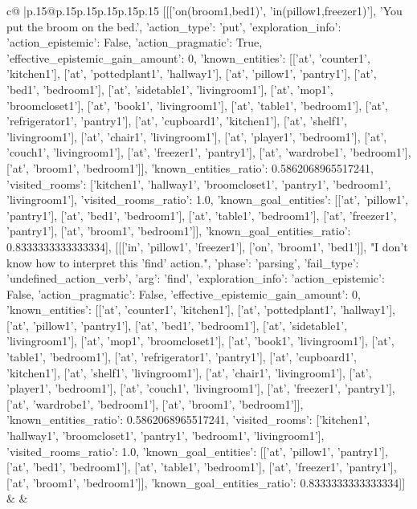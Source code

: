 \documentclass{article}
\begin{document}
{\begin{supertabular}{c@{$\;$}|p{.15\linewidth}@{}p{.15\linewidth}p{.15\linewidth}p{.15\linewidth}p{.15\linewidth}p{.15\linewidth}}
{{{	 [[['on(broom1,bed1)', 'in(pillow1,freezer1)'], 'You put the broom on the bed.', {'action_type': 'put', 'exploration_info': {'action_epistemic': False, 'action_pragmatic': True, 'effective_epistemic_gain_amount': 0, 'known_entities': [['at', 'counter1', 'kitchen1'], ['at', 'pottedplant1', 'hallway1'], ['at', 'pillow1', 'pantry1'], ['at', 'bed1', 'bedroom1'], ['at', 'sidetable1', 'livingroom1'], ['at', 'mop1', 'broomcloset1'], ['at', 'book1', 'livingroom1'], ['at', 'table1', 'bedroom1'], ['at', 'refrigerator1', 'pantry1'], ['at', 'cupboard1', 'kitchen1'], ['at', 'shelf1', 'livingroom1'], ['at', 'chair1', 'livingroom1'], ['at', 'player1', 'bedroom1'], ['at', 'couch1', 'livingroom1'], ['at', 'freezer1', 'pantry1'], ['at', 'wardrobe1', 'bedroom1'], ['at', 'broom1', 'bedroom1']], 'known_entities_ratio': 0.5862068965517241, 'visited_rooms': ['kitchen1', 'hallway1', 'broomcloset1', 'pantry1', 'bedroom1', 'livingroom1'], 'visited_rooms_ratio': 1.0, 'known_goal_entities': [['at', 'pillow1', 'pantry1'], ['at', 'bed1', 'bedroom1'], ['at', 'table1', 'bedroom1'], ['at', 'freezer1', 'pantry1'], ['at', 'broom1', 'bedroom1']], 'known_goal_entities_ratio': 0.8333333333333334}}], [[['in', 'pillow1', 'freezer1'], ['on', 'broom1', 'bed1']], "I don't know how to interpret this 'find' action.", {'phase': 'parsing', 'fail_type': 'undefined_action_verb', 'arg': 'find', 'exploration_info': {'action_epistemic': False, 'action_pragmatic': False, 'effective_epistemic_gain_amount': 0, 'known_entities': [['at', 'counter1', 'kitchen1'], ['at', 'pottedplant1', 'hallway1'], ['at', 'pillow1', 'pantry1'], ['at', 'bed1', 'bedroom1'], ['at', 'sidetable1', 'livingroom1'], ['at', 'mop1', 'broomcloset1'], ['at', 'book1', 'livingroom1'], ['at', 'table1', 'bedroom1'], ['at', 'refrigerator1', 'pantry1'], ['at', 'cupboard1', 'kitchen1'], ['at', 'shelf1', 'livingroom1'], ['at', 'chair1', 'livingroom1'], ['at', 'player1', 'bedroom1'], ['at', 'couch1', 'livingroom1'], ['at', 'freezer1', 'pantry1'], ['at', 'wardrobe1', 'bedroom1'], ['at', 'broom1', 'bedroom1']], 'known_entities_ratio': 0.5862068965517241, 'visited_rooms': ['kitchen1', 'hallway1', 'broomcloset1', 'pantry1', 'bedroom1', 'livingroom1'], 'visited_rooms_ratio': 1.0, 'known_goal_entities': [['at', 'pillow1', 'pantry1'], ['at', 'bed1', 'bedroom1'], ['at', 'table1', 'bedroom1'], ['at', 'freezer1', 'pantry1'], ['at', 'broom1', 'bedroom1']], 'known_goal_entities_ratio': 0.8333333333333334}}]] 
	  } 
	   } 
	   } 
	 & & \\ 
 

    \theutterance {}  


\end{supertabular}}
\end{document}
